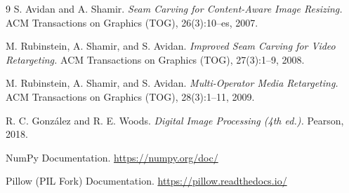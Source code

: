 \documentclass[12pt,a4paper]{article}
\begin{document}
\begin{thebibliography}{9}
\def\refname{References}
 S. Avidan and A. Shamir.
    \emph{Seam Carving for Content-Aware Image Resizing.}
    ACM Transactions on Graphics (TOG), 26(3):10--es, 2007.

 M. Rubinstein, A. Shamir, and S. Avidan.
    \emph{Improved Seam Carving for Video Retargeting.}
    ACM Transactions on Graphics (TOG), 27(3):1--9, 2008.

 M. Rubinstein, A. Shamir, and S. Avidan.
    \emph{Multi-Operator Media Retargeting.}
    ACM Transactions on Graphics (TOG), 28(3):1--11, 2009.

 R. C. Gonz\'alez and R. E. Woods.
    \emph{Digital Image Processing (4th ed.).}
    Pearson, 2018.

 NumPy Documentation. \url{https://numpy.org/doc/}

 Pillow (PIL Fork) Documentation. \url{https://pillow.readthedocs.io/}
\end{thebibliography}
\end{document}
